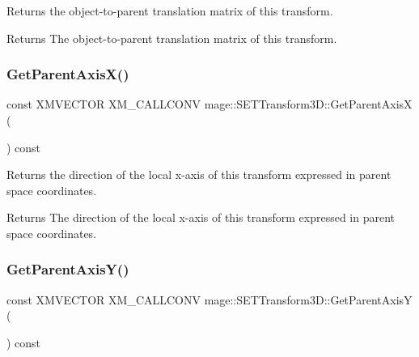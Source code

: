 Returns the object-\/to-\/parent translation matrix of this transform.

\begin{DoxyReturn}{Returns}
The object-\/to-\/parent translation matrix of this transform. 
\end{DoxyReturn}
\mbox{\label{classmage_1_1_s_e_t_transform3_d_a96989862756316426ddac23f56a0f30f}} 
\subsubsection{\texorpdfstring{Get\+Parent\+Axis\+X()}{GetParentAxisX()}}
{\footnotesize\ttfamily const X\+M\+V\+E\+C\+T\+OR X\+M\+\_\+\+C\+A\+L\+L\+C\+O\+NV mage\+::\+S\+E\+T\+Transform3\+D\+::\+Get\+Parent\+AxisX (\begin{DoxyParamCaption}{ }\end{DoxyParamCaption}) const\hspace{0.3cm}{\ttfamily [noexcept]}}

Returns the direction of the local x-\/axis of this transform expressed in parent space coordinates.

\begin{DoxyReturn}{Returns}
The direction of the local x-\/axis of this transform expressed in parent space coordinates. 
\end{DoxyReturn}
\mbox{\label{classmage_1_1_s_e_t_transform3_d_ac2c63e65c35f30afe888a2a8c3b45da3}} 
\subsubsection{\texorpdfstring{Get\+Parent\+Axis\+Y()}{GetParentAxisY()}}
{\footnotesize\ttfamily const X\+M\+V\+E\+C\+T\+OR X\+M\+\_\+\+C\+A\+L\+L\+C\+O\+NV mage\+::\+S\+E\+T\+Transform3\+D\+::\+Get\+Parent\+AxisY (\begin{DoxyParamCaption}{ }\end{DoxyParamCaption}) const\hspace{0.3cm}{\ttfamily [noexcept]}}

